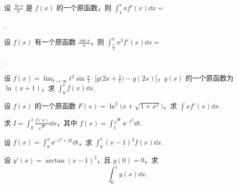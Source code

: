 	\begin{ti}
		设 $\frac{\ln x}{x}$ 是 $f(x)$ 的一个原函数，则 $\int_{1}^{\ee} x f'(x) \dd{x} = $
		
		\noindent\htwo.
	\end{ti}

	\begin{ti}
		设 $f(x)$ 有一个原函数 $\frac{\sin x}{x}$，则 $\int_{\frac{\uppi}{2}}^{\uppi} x^{3} f'(x) \dd{x} = $
		
		\noindent\htwo.
	\end{ti}

	\begin{ti}
		设 $f(x) = \lim_{t \to \infty} t^{2} \sin \frac{x}{t} \cdot \bigl[ g\bigl( 2x + \frac{1}{t} \bigr) - g(2x) \bigr]$，$g(x)$ 的一个原函数为 $\ln(x + 1)$，求 $\int_{0}^{1} f(x) \dd{x}$.
	\end{ti}

	\begin{ti}
		设 $f(x)$ 的一个原函数 $F(x) = \ln^{2}\bigl( x + \sqrt{1 + x^{2}} \bigr)$，求 $\int x f'(x) \dd{x}$.
	\end{ti}

	\begin{ti}
		求 $I = \int_{0}^{1} \frac{f(x)}{\sqrt{x}} \dd{x}$，其中 $f(x) = \int_{1}^{\sqrt{x}} \ee^{-t^{2}} \dd{t}$.
	\end{ti}

	\begin{ti}
		设 $f(x) = \int_{0}^{x} \ee^{-t^{2} + 2t} \dd{t}$，求 $\int_{0}^{1} (x - 1)^{2} f(x) \dd{x}$.
	\end{ti}

	\begin{ti}
		设 $y'(x) = \arctan (x - 1)^{2}$，且 $y(0) = 0$，求
		\[
			\int_{0}^{1} y(x) \dd{x}.
		\]
	\end{ti}